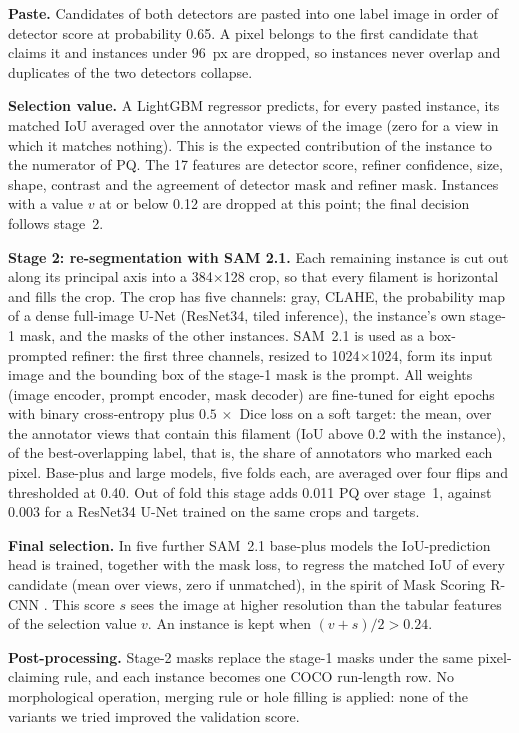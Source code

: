 \documentclass[sigconf]{acmart}
\begin{document}
\textbf{Paste.} Candidates of both detectors are pasted into one label image in order of detector score at probability 0.65. A pixel belongs to the first candidate that claims it and instances under 96~px are dropped, so instances never overlap and duplicates of the two detectors collapse.

\textbf{Selection value.} A LightGBM regressor \cite{lightgbm} predicts, for every pasted instance, its matched IoU averaged over the annotator views of the image (zero for a view in which it matches nothing). This is the expected contribution of the instance to the numerator of PQ. The 17 features are detector score, refiner confidence, size, shape, contrast and the agreement of detector mask and refiner mask. Instances with a value $v$ at or below 0.12 are dropped at this point; the final decision follows stage~2.

\textbf{Stage 2: re-segmentation with SAM 2.1.} Each remaining instance is cut out along its principal axis into a 384$\times$128 crop, so that every filament is horizontal and fills the crop. The crop has five channels: gray, CLAHE, the probability map of a dense full-image U-Net (ResNet34, tiled inference), the instance's own stage-1 mask, and the masks of the other instances. SAM~2.1 \cite{sam2} is used as a box-prompted refiner: the first three channels, resized to 1024$\times$1024, form its input image and the bounding box of the stage-1 mask is the prompt. All weights (image encoder, prompt encoder, mask decoder) are fine-tuned for eight epochs with binary cross-entropy plus $0.5\,\times$ Dice loss on a soft target: the mean, over the annotator views that contain this filament (IoU above 0.2 with the instance), of the best-overlapping label, that is, the share of annotators who marked each pixel. Base-plus and large models, five folds each, are averaged over four flips and thresholded at 0.40. Out of fold this stage adds 0.011 PQ over stage~1, against 0.003 for a ResNet34 U-Net trained on the same crops and targets.

\textbf{Final selection.} In five further SAM~2.1 base-plus models the IoU-prediction head is trained, together with the mask loss, to regress the matched IoU of every candidate (mean over views, zero if unmatched), in the spirit of Mask Scoring R-CNN \cite{msrcnn}. This score $s$ sees the image at higher resolution than the tabular features of the selection value $v$. An instance is kept when $(v+s)/2>0.24$.

\textbf{Post-processing.} Stage-2 masks replace the stage-1 masks under the same pixel-claiming rule, and each instance becomes one COCO run-length row. No morphological operation, merging rule or hole filling is applied: none of the variants we tried improved the validation score.
\end{document}
